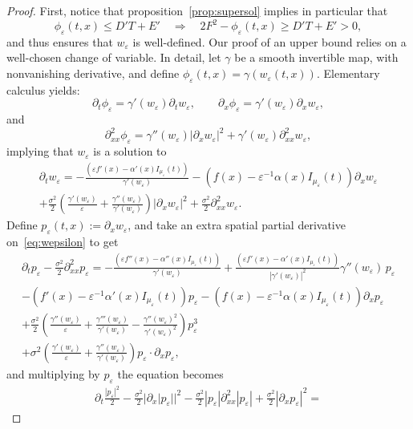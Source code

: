 \documentclass[onefignum,onetabnum]{siamart190516}
\newcommand{\1}{\mathbbm{1}}
\newcommand{\eps}{\varepsilon}
\begin{document}
\begin{proof}
First, notice that proposition~\ref{prop:supersol} implies in particular that
$$
\phi_\eps(t,x)\leq D'T+E'\quad\Rightarrow\quad 2F^2-\phi_\eps(t,x)\geq D'T+E'>0,
$$
and thus ensures that $w_\eps$ is well-defined. Our proof of an upper bound relies on a well-chosen change of variable. In detail, let $\gamma$ be a smooth invertible map, with nonvanishing derivative, and define $\phi_\eps(t,x)=\gamma(w_\eps(t,x))$. Elementary calculus yields:
$$
\partial_t\phi_\eps = \gamma'(w_\eps)\partial_tw_\eps,\qquad \partial_x\phi_\eps = \gamma'(w_\eps)\partial_xw_\eps,
$$
and
$$
\partial^2_{xx}\phi_\eps=\gamma''(w_\eps)|\partial_xw_\eps|^2+\gamma'(w_\eps)\partial^2_{xx}w_\eps,
$$
implying that $w_\eps$ is a solution to
\begin{multline}
\partial_tw_\eps = -\frac{\left(\eps f'(x) - \alpha'(x)I_{\mu_\eps}(t) \right)}{\gamma'(w_\eps)}-  \left( f(x)- \eps^{-1}\alpha(x) I_{\mu_\eps}(t)\right)\partial_xw_\eps
\\
 + \frac{\sigma^2}{2}\left(\frac{\gamma'(w_\eps)}{\eps}+\frac{\gamma''(w_\eps)}{\gamma'(w_\eps)}\right) \vert \partial_x w_\eps \vert^2  + \frac {\sigma^2}{2} \partial_{xx}^2 w_\eps.
\label{eq:wepsilon}
\end{multline}
Define $p_\eps(t,x):=\partial_xw_\eps$, and take an extra spatial partial derivative on~\eqref{eq:wepsilon} to get
\begin{multline*}
\partial_tp_\eps- \frac {\sigma^2}{2} \partial_{xx}^2 p_\eps = -\frac{\left(\eps f''(x) - \alpha''(x)I_{\mu_\eps}(t) \right)}{\gamma'(w_\eps)}+\frac{\left(\eps f'(x) - \alpha'(x)I_{\mu_\eps}(t) \right)}{|\gamma'(w_\eps)|^2}\gamma''(w_\eps)\,p_\eps
\\
-  \left( f'(x)- \eps^{-1}\alpha'(x) I_{\mu_\eps}(t)\right)p_\eps-  \left( f(x)- \eps^{-1}\alpha(x) I_{\mu_\eps}(t)\right)\partial_xp_\eps
\\
 + \frac{\sigma^2}{2}\left(\frac{\gamma''(w_\eps)}{\eps}+\frac{\gamma'''(w_\eps)}{\gamma'(w_\eps)}-\frac{\gamma''(w_\eps)^2}{\gamma'(w_\eps)^2}\right)  p_\eps^3
 \\ 
 + \sigma^2\left(\frac{\gamma'(w_\eps)}{\eps}+\frac{\gamma''(w_\eps)}{\gamma'(w_\eps)}\right) p_\eps \cdot\partial_x p_\eps,
\end{multline*}
and multiplying by $p_\eps$ the equation becomes
\begin{multline*}
\partial_t\frac{|p_\eps|^2}{2}-\frac{\sigma^2}{2}|\partial_x|p_\eps||^2-\frac{\sigma^2}{2}|p_\eps|\partial^2_{xx}|p_\eps|+\frac{\sigma^2}{2}|\partial_xp_\eps|^2
=

\end{multline*}
\end{proof}
\end{document}
